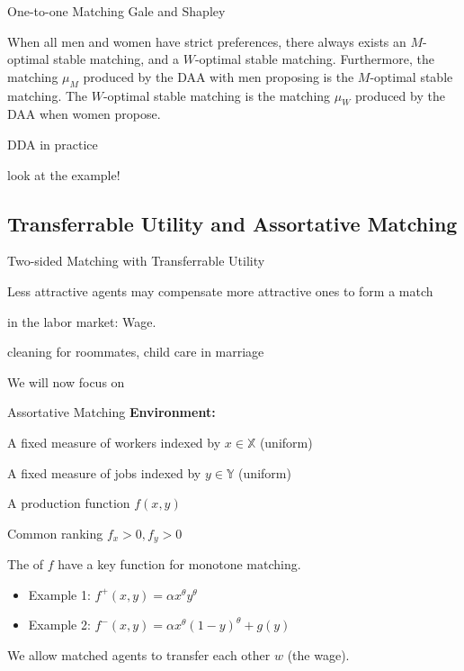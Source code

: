 \documentclass{beamer}%
\begin{document}
\begin{frame}{One-to-one Matching Gale and Shapley}
\begin{tcolorbox}[colback=red!5!white,colframe=red!75!black,title=Theorem (Gale and Shapley),fonttitle=\bfseries] 
When all men and women have strict preferences, there always exists an $M$-optimal stable matching, and a $W$-optimal stable matching. Furthermore, the matching $\mu_M$ produced by the DAA with men proposing is the $M$-optimal stable matching. The $W$-optimal stable matching is the matching $\mu_W$ produced by the DAA when women propose.
\end{tcolorbox}

\end{frame}

\begin{frame}{DDA in practice}

look at the example!

\end{frame}

\subsection{Transferrable Utility and Assortative Matching}
\begin{frame}
\tableofcontents[currentsubsection] 
\end{frame}

\begin{frame}{Two-sided Matching with Transferrable Utility}
\begin{midi}
\item Less attractive agents may compensate more attractive ones to form a match
\item in the labor market: Wage.
\item cleaning for roommates, child care in marriage
\item We will now focus on 
\end{midi}
\end{frame}

\begin{frame}{Assortative Matching}
\textbf{Environment:}
\begin{midi}
\item A fixed measure of workers indexed by $x \in \mathbb{X}$ (uniform)
\item A fixed measure of jobs indexed by $y \in \mathbb{Y}$ (uniform)
\item A production function $f(x,y)$
\item Common ranking $f_x>0, f_y>0$
\item The  of $f$ have a key function for monotone matching.
\begin{itemize}
\item Example 1: $f^+(x,y) = \alpha x^\theta y^\theta$
\item Example 2: $f^-(x,y) = \alpha x^\theta (1-y)^\theta + g(y)$
\end{itemize}
\item We allow matched agents to transfer each other $w$ (the wage).
\end{midi}
\end{frame}
\end{document}
